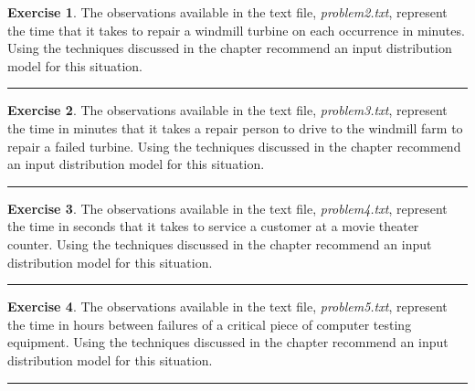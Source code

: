 \documentclass[
]{book}
\theoremstyle{definition}
\theoremstyle{definition}
\theoremstyle{definition}
\newtheorem{exercise}{Exercise}[chapter]
\theoremstyle{definition}
\theoremstyle{remark}
\begin{document}
\begin{exercise}
\protect\hypertarget{exr:AppDistFitP2}{}{\label{exr:AppDistFitP2} }The observations available in the text
file, \emph{problem2.txt}, represent the time that it takes to repair a
windmill turbine on each occurrence in minutes. Using the techniques
discussed in the chapter recommend an input distribution model for this
situation.
\end{exercise}

\begin{center}\rule{0.5\linewidth}{0.5pt}\end{center}

\begin{exercise}
\protect\hypertarget{exr:AppDistFitP3}{}{\label{exr:AppDistFitP3} }The observations available in the text
file, \emph{problem3.txt}, represent the time in minutes that it takes a
repair person to drive to the windmill farm to repair a failed turbine.
Using the techniques discussed in the chapter recommend an input
distribution model for this situation.
\end{exercise}

\begin{center}\rule{0.5\linewidth}{0.5pt}\end{center}

\begin{exercise}
\protect\hypertarget{exr:AppDistFitP4}{}{\label{exr:AppDistFitP4} }The observations available in the text
file, \emph{problem4.txt}, represent the time in seconds that it takes to
service a customer at a movie theater counter. Using the techniques
discussed in the chapter recommend an input distribution model for this
situation.
\end{exercise}

\begin{center}\rule{0.5\linewidth}{0.5pt}\end{center}

\begin{exercise}
\protect\hypertarget{exr:AppDistFitP5}{}{\label{exr:AppDistFitP5} }The observations available in the text
file, \emph{problem5.txt}, represent the time in hours between failures of
a critical piece of computer testing equipment. Using the techniques
discussed in the chapter recommend an input distribution model for this
situation.
\end{exercise}

\begin{center}\rule{0.5\linewidth}{0.5pt}\end{center}
\end{document}
